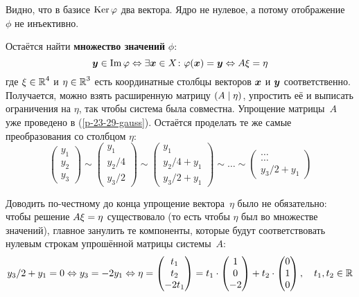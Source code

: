 \documentclass[a4paper,12pt]{article}
\DeclareMathOperator{\Imag}{Im}
\begin{document}
\begin{solution}
    Видно, что в базисе $\operatorname{Ker}\varphi$ два вектора.
    Ядро не нулевое, а потому отображение~$\phi$ не инъективно.
    
    \medskip
    
    Остаётся найти \textbf{множество значений} $\phi$:
    \[
      \bds y \in \Imag\phi \Leftrightarrow \exists \bds x \in X \colon \phi(\bds x) = \bds y \Leftrightarrow A \xi = \eta
    \]
    где $\xi \hm\in \RR^4$ и $\eta \hm\in \RR^3$ есть координатные столбцы векторов $\boldsymbol x$ и $\boldsymbol y$ соответственно.
    Получается, можно взять расширенную матрицу $(A \hm\mid \eta)$, упростить её и выписать ограничения на $\eta$, так чтобы система была совместна.
    Упрощение матрицы~$A$ уже проведено в (\ref{p-23-29-gauss}).
    Остаётся проделать те же самые преобразования со столбцом $\eta$:
    \[
      \begin{pmatrix}
        y_1 \\ y_2 \\ y_3
      \end{pmatrix}
      \sim \begin{pmatrix}
         y_1 \\ y_2/4 \\ y_3/2
      \end{pmatrix}
      \sim \begin{pmatrix}
         y_1 \\ y_2/4 + y_1 \\ y_3/2 + y_1
      \end{pmatrix}
      \sim \ldots
      \sim \begin{pmatrix}
         \ldots \\ \ldots \\ \boxed{y_3/2 + y_1}
      \end{pmatrix}
    \]
    
    Доводить по-честному до конца упрощение вектора~$\eta$ было не обязательно: чтобы решение $A \xi \hm= \eta$ существовало (то есть чтобы $\eta$ был во множестве значений), главное занулить те компоненты, которые будут соответствовать нулевым строкам упрошённой матрицы системы~$A$:
    \[
      y_3/2 + y_1 = 0
      \Leftrightarrow y_3 = -2 y_1
      \Leftrightarrow \eta = \begin{pmatrix}
        t_1 \\ t_2 \\ -2 t_1
      \end{pmatrix} = t_1 \cdot \begin{pmatrix}
        1 \\ 0 \\ -2
      \end{pmatrix} + t_2 \cdot \begin{pmatrix}
        0 \\ 1 \\ 0
      \end{pmatrix},\quad t_1, t_2 \in \operatorname{\mathbb R}
    \]
    

\end{solution}
\end{document}
